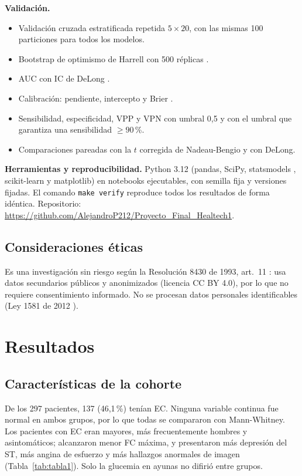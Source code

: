 \documentclass[twocolumn,10pt]{article}
\begin{document}
\textbf{Validaci\'on.}
\begin{itemize}
\item Validaci\'on cruzada estratificada repetida $5\times20$, con las mismas 100 particiones para todos los modelos.
\item Bootstrap de optimismo de Harrell con 500 r\'eplicas \cite{harrell2015}.
\item AUC con IC de DeLong \cite{delong1988,sun2014}.
\item Calibraci\'on: pendiente, intercepto y Brier \cite{vancalster2019}.
\item Sensibilidad, especificidad, VPP y VPN con umbral 0,5 y con el umbral que garantiza una sensibilidad $\geq90$\,\%.
\item Comparaciones pareadas con la $t$ corregida de Nadeau-Bengio \cite{nadeau2003} y con DeLong.
\end{itemize}

\textbf{Herramientas y reproducibilidad.} Python 3.12 (pandas, SciPy, statsmodels \cite{seabold2010}, scikit-learn y matplotlib) en notebooks ejecutables, con semilla fija y versiones fijadas. El comando \texttt{make verify} reproduce todos los resultados de forma id\'entica. Repositorio: \url{https://github.com/AlejandroP212/Proyecto_Final_Healtech1}.

\subsection{Consideraciones \'eticas}
Es una investigaci\'on sin riesgo seg\'un la Resoluci\'on 8430 de 1993, art.~11 \cite{res8430}: usa datos secundarios p\'ublicos y anonimizados (licencia CC BY 4.0), por lo que no requiere consentimiento informado. No se procesan datos personales identificables (Ley 1581 de 2012 \cite{ley1581}).

\section{Resultados}
\subsection{Caracter\'isticas de la cohorte}
De los 297 pacientes, 137 (46,1\,\%) ten\'ian EC. Ninguna variable continua fue normal en ambos grupos, por lo que todas se compararon con Mann-Whitney. Los pacientes con EC eran mayores, m\'as frecuentemente hombres y asintom\'aticos; alcanzaron menor FC m\'axima, y presentaron m\'as depresi\'on del ST, m\'as angina de esfuerzo y m\'as hallazgos anormales de imagen (Tabla~\ref{tab:tabla1}). Solo la glucemia en ayunas no difiri\'o entre grupos.
\end{document}
